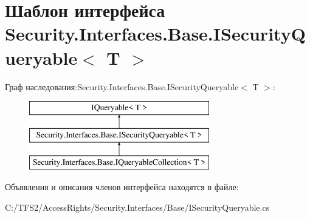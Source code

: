 \hypertarget{interface_security_1_1_interfaces_1_1_base_1_1_i_security_queryable}{}\section{Шаблон интерфейса Security.\+Interfaces.\+Base.\+I\+Security\+Queryable$<$ T $>$}
\label{interface_security_1_1_interfaces_1_1_base_1_1_i_security_queryable}
Граф наследования\+:Security.\+Interfaces.\+Base.\+I\+Security\+Queryable$<$ T $>$\+:\begin{figure}[H]
\begin{center}
\leavevmode
\includegraphics[height=3.000000cm]{d1/da5/interface_security_1_1_interfaces_1_1_base_1_1_i_security_queryable}
\end{center}
\end{figure}


Объявления и описания членов интерфейса находятся в файле\+:\begin{DoxyCompactItemize}
\item 
C\+:/\+T\+F\+S2/\+Access\+Rights/\+Security.\+Interfaces/\+Base/I\+Security\+Queryable.\+cs\end{DoxyCompactItemize}
